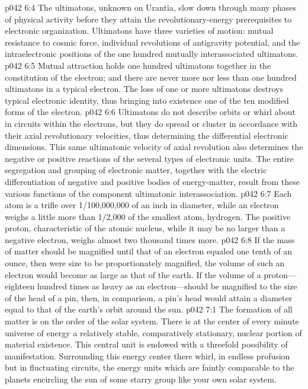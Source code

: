 \pc \vs p042 6:4 The ultimatons, unknown on Urantia, slow down through many phases of physical activity before they attain the revolutionary\hyp{}energy prerequisites to electronic organization. Ultimatons have three varieties of motion: mutual resistance to cosmic force, individual revolutions of antigravity potential, and the intraelectronic positions of the one hundred mutually interassociated ultimatons.
\vs p042 6:5 Mutual attraction holds one hundred ultimatons together in the constitution of the electron; and there are never more nor less than one hundred ultimatons in a typical electron. The loss of one or more ultimatons destroys typical electronic identity, thus bringing into existence one of the ten modified forms of the electron.\plusone
\vs p042 6:6 Ultimatons do not describe orbits or whirl about in circuits within the electrons, but they do spread or cluster in accordance with their axial revolutionary velocities, thus determining the differential electronic dimensions. This same ultimatonic velocity of axial revolution also determines the negative or positive reactions of the several types of electronic units. The entire segregation and grouping of electronic matter, together with the electric differentiation of negative and positive bodies of energy\hyp{}matter, result from these various functions of the component ultimatonic interassociation.
\pc \vs p042 6:7 Each atom is a trifle over 1/100,000,000 of an inch in diameter, while an electron weighs a little more than 1/2,000 of the smallest atom, hydrogen. The positive proton, characteristic of the atomic nucleus, while it may be no larger than a negative electron, weighs almost two thousand times more.
\pc \vs p042 6:8 If the mass of matter should be magnified until that of an electron equaled one tenth of an ounce, then were size to be proportionately magnified, the volume of such an electron would become as large as that of the earth. If the volume of a proton---eighteen hundred times as heavy as an electron---should be magnified to the size of the head of a pin, then, in comparison, a pin’s head would attain a diameter equal to that of the earth’s orbit around the sun.
\vs p042 7:1 The formation of all matter is on the order of the solar system. There is at the center of every minute universe of energy a relatively stable, comparatively stationary, nuclear portion of material existence. This central unit is endowed with a threefold possibility of manifestation. Surrounding this energy center there whirl, in endless profusion but in fluctuating circuits, the energy units which are faintly comparable to the planets encircling the sun of some starry group like your own solar system.
